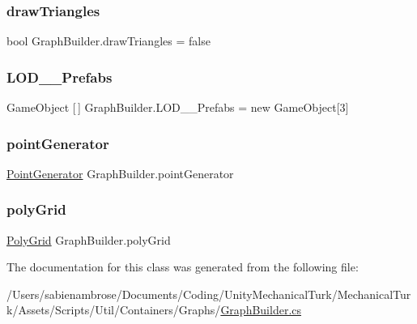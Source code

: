 \mbox{\label{class_graph_builder_aacf2833ccc9ae6f68197e594ed8b3183}} 
\subsubsection{\texorpdfstring{draw\+Triangles}{drawTriangles}}
{\footnotesize\ttfamily bool Graph\+Builder.\+draw\+Triangles = false}

\mbox{\label{class_graph_builder_a0b87acbb20c7641e19a499818a100e8a}} 
\subsubsection{\texorpdfstring{L\+O\+D\+\_\+\_\+\+Prefabs}{LOD\_0\_Prefabs}}
{\footnotesize\ttfamily Game\+Object \mbox{[}$\,$\mbox{]} Graph\+Builder.\+L\+O\+D\+\_\+\_\+\+Prefabs = new Game\+Object\mbox{[}3\mbox{]}}

\mbox{\label{class_graph_builder_a621748ddd5e210bde566ddf1bffa1bbe}} 
\subsubsection{\texorpdfstring{point\+Generator}{pointGenerator}}
{\footnotesize\ttfamily \mbox{\hyperlink{class_point_generator}{Point\+Generator}} Graph\+Builder.\+point\+Generator}

\mbox{\label{class_graph_builder_afc729c2338a301483a3f96e6106799bb}} 
\subsubsection{\texorpdfstring{poly\+Grid}{polyGrid}}
{\footnotesize\ttfamily \mbox{\hyperlink{class_poly_grid}{Poly\+Grid}} Graph\+Builder.\+poly\+Grid}



The documentation for this class was generated from the following file\+:\begin{DoxyCompactItemize}
\item 
/\+Users/sabienambrose/\+Documents/\+Coding/\+Unity\+Mechanical\+Turk/\+Mechanical\+Turk/\+Assets/\+Scripts/\+Util/\+Containers/\+Graphs/\mbox{\hyperlink{_graph_builder_8cs}{Graph\+Builder.\+cs}}\end{DoxyCompactItemize}
